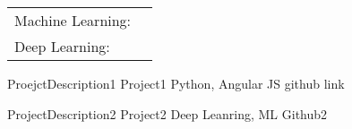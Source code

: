 \documentclass[]{awesome-cv}
\begin{document}
\vspace{-2mm}
\begin{cventries}
	\cventry
	{}
	{\def\arraystretch{1.15}{\begin{tabular}{ l l }
		Machine Learning:  & {\skill{ Imbalance Classification, Statistical Analysis}} \\
		Deep Learning:  & {\skill{ CNN}} \\
		\end{tabular}}}
	{}
	{}
	{}
\end{cventries}

\vspace{-7mm}
\begin{cventries}
	\cventry
	{ProejctDescription1}
	{Project1}
	{Python, Angular JS}
	{github link}
	{}
	
	\vspace{-5mm}
	\cventry
	{ProjectDescription2}
	{Project2}
	{Deep Leanring, ML}
	{Github2}
	{}
	
	\vspace{-5mm}
\end{cventries}
\ 
\end{document}
